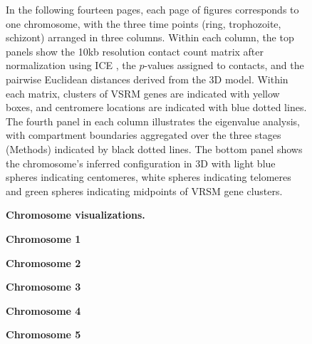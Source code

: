 \documentclass{article}
\begin{document}
\thispagestyle{empty}
\pagestyle{empty}
\begin{figure}
\caption{{\bf Chromosome visualizations.}}
{ In the following fourteen pages, each page of figures corresponds to one chromosome, with the three time points (ring, trophozoite, schizont) arranged in three columns.  Within each column, the top panels show the 10kb resolution contact count matrix after normalization using ICE \cite{imakaev:iterative}, the $p$-values assigned to contacts, and the pairwise Euclidean distances derived from the 3D model.  Within each matrix, clusters of VSRM genes are indicated with yellow boxes, and centromere locations are indicated with blue dotted lines.  The fourth panel in each column illustrates the eigenvalue analysis, with compartment boundaries aggregated over the three stages (Methods) indicated by black dotted lines. The bottom panel shows the chromosome's inferred configuration in 3D with light blue spheres indicating centomeres, white spheres indicating telomeres and green spheres indicating midpoints of VRSM gene clusters.}
\label{suppfig:perChrFigs}
\end{figure}

\setcounter{figure}{2} %
\begin{figure}
\textbf{Chromosome 1}
\centering
{}
\end{figure}

\begin{figure}
\textbf{Chromosome 2}
\centering
\ContinuedFloat
{}
\end{figure}

\begin{figure}
\textbf{Chromosome 3}
\centering
\ContinuedFloat
{}
\end{figure}

\begin{figure}
\textbf{Chromosome 4}
\centering
\ContinuedFloat
{}
\end{figure}

\begin{figure}
\textbf{Chromosome 5}
\centering
\ContinuedFloat
{}
\end{figure}
\end{document}
